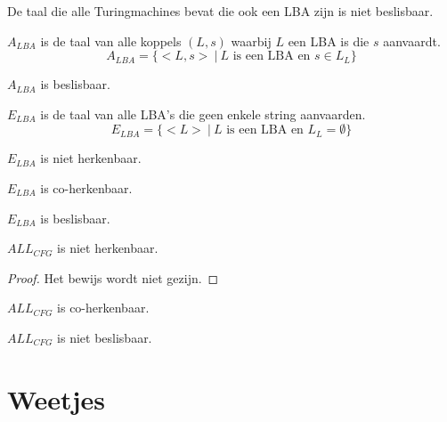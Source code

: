 \documentclass[main.tex]{subfiles}
\begin{document}
\begin{st}
  De taal die alle Turingmachines bevat die ook een LBA zijn is niet beslisbaar.
\end{st}

\begin{de}
  $A_{LBA}$ is de taal van alle koppels $(L,s)$ waarbij $L$ een LBA is die $s$ aanvaardt.
  \[ A_{LBA} = \{ <L,s> \ |\ L \text{ is een LBA en } s \in L_{L}\} \]
\end{de}

\begin{st}
  $A_{LBA}$ is beslisbaar.
\end{st}

\begin{de}
  $E_{LBA}$ is de taal van alle LBA's die geen enkele string aanvaarden.
  \[ E_{LBA} = \{ <L> \ |\ L \text{ is een LBA en } L_{L} = \emptyset \} \]
\end{de}

\begin{st}
  $E_{LBA}$ is niet herkenbaar.
\end{st}

\begin{st}
  $E_{LBA}$ is co-herkenbaar.
\end{st}

\begin{gev}
  $E_{LBA}$ is beslisbaar.
\end{gev}


\begin{st}
  $ALL_{CFG}$ is niet herkenbaar.
  \begin{proof}
    Het bewijs wordt niet gezijn.
  \end{proof}
\end{st}

\begin{st}
  $ALL_{CFG}$ is co-herkenbaar.
\end{st}

\begin{gev}
  $ALL_{CFG}$ is niet beslisbaar.
\end{gev}


\section{Weetjes}
\label{sec:weetjes}
\end{document}
